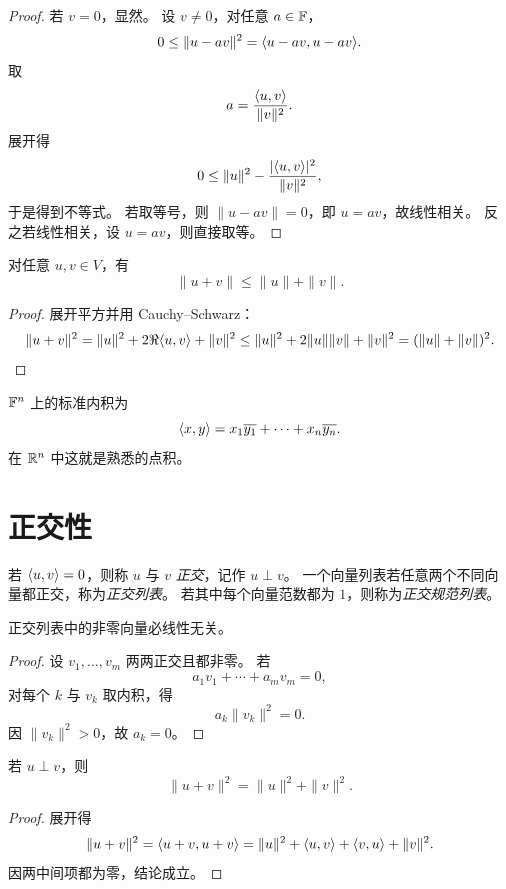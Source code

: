 \begin{proof}
若 $v=0$，显然。
设 $v\neq 0$，对任意 $a\in\mathbb{F}$，
\[
0\le \|u-av\|^2=\langle u-av, u-av \rangle.
\]
取
\[
a=\frac{\langle u, v \rangle}{\|v\|^2}.
\]
展开得
\[
0\le \|u\|^2-\frac{|\langle u, v \rangle|^2}{\|v\|^2},
\]
于是得到不等式。
若取等号，则 $\|u-av\|=0$，即 $u=av$，故线性相关。
反之若线性相关，设 $u=av$，则直接取等。
\end{proof}

\begin{corollary}[三角不等式]
对任意 $u,v\in V$，有
\[
\|u+v\|\le \|u\|+\|v\|.
\]
\end{corollary}

\begin{proof}
展开平方并用 Cauchy--Schwarz：
\[
\|u+v\|^2=\|u\|^2+2\Re\langle u, v \rangle+\|v\|^2
\le \|u\|^2+2\|u\|\|v\|+\|v\|^2=(\|u\|+\|v\|)^2.
\]
\end{proof}

\begin{example}
$\mathbb{F}^n$ 上的标准内积为
\[
\langle x, y \rangle=x_1\overline{y_1}+\cdots+x_n\overline{y_n}.
\]
在 $\mathbb{R}^n$ 中这就是熟悉的点积。
\end{example}

\section{正交性}

\begin{definition}
若 $\langle u, v \rangle=0$，则称 $u$ 与 $v$ \emph{正交}，记作 $u\perp v$。
一个向量列表若任意两个不同向量都正交，称为\emph{正交列表}。
若其中每个向量范数都为 $1$，则称为\emph{正交规范列表}。
\end{definition}

\begin{proposition}
正交列表中的非零向量必线性无关。
\end{proposition}

\begin{proof}
设 $v_1,\dots,v_m$ 两两正交且都非零。
若
\[
a_1v_1+\cdots+a_mv_m=0,
\]
对每个 $k$ 与 $v_k$ 取内积，得
\[
a_k\|v_k\|^2=0.
\]
因 $\|v_k\|^2>0$，故 $a_k=0$。
\end{proof}

\begin{theorem}[Pythagorean 定理]
若 $u\perp v$，则
\[
\|u+v\|^2=\|u\|^2+\|v\|^2.
\]
\end{theorem}

\begin{proof}
展开得
\[
\|u+v\|^2=\langle u+v, u+v \rangle=\|u\|^2+\langle u, v \rangle+\langle v, u \rangle+\|v\|^2.
\]
因两中间项都为零，结论成立。
\end{proof}

